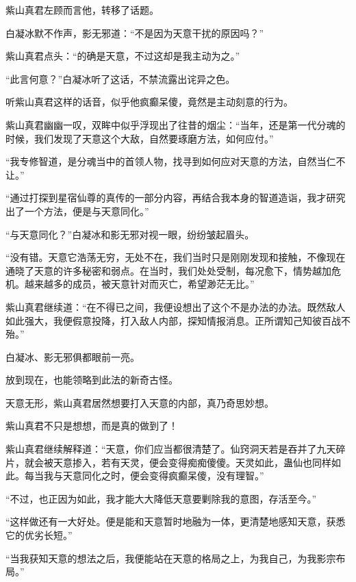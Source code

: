 
\begin{this_body}



紫山真君左顾而言他，转移了话题。

白凝冰默不作声，影无邪道：“不是因为天意干扰的原因吗？”

紫山真君点头：“的确是天意，不过这却是我主动为之。”

“此言何意？”白凝冰听了这话，不禁流露出诧异之色。

听紫山真君这样的话音，似乎他疯癫呆傻，竟然是主动刻意的行为。

紫山真君幽幽一叹，双眸中似乎浮现出了往昔的烟尘：“当年，还是第一代分魂的时候，我们发现了天意这个大敌，自然要琢磨方法，如何应付。”

“我专修智道，是分魂当中的首领人物，找寻到如何应对天意的方法，自然当仁不让。”

“通过打探到星宿仙尊的真传的一部分内容，再结合我本身的智道造诣，我才研究出了一个方法，便是与天意同化。”

“与天意同化？”白凝冰和影无邪对视一眼，纷纷皱起眉头。

“没有错。天意它浩荡无穷，无处不在，我们当时只是刚刚发现和接触，不像现在通晓了天意的许多秘密和弱点。在当时，我们处处受制，每况愈下，情势越加危机。越来越多的成员，被天意针对而灭亡，希望渺茫无比。”

紫山真君继续道：“在不得已之间，我便设想出了这个不是办法的办法。既然敌人如此强大，我便假意投降，打入敌人内部，探知情报消息。正所谓知己知彼百战不殆。”

白凝冰、影无邪俱都眼前一亮。

放到现在，也能领略到此法的新奇古怪。

天意无形，紫山真君居然想要打入天意的内部，真乃奇思妙想。

紫山真君不只是想想，而是真的做到了！

紫山真君继续解释道：“天意，你们应当都很清楚了。仙窍洞天若是吞并了九天碎片，就会被天意掺入，若有天灵，便会变得痴痴傻傻。天灵如此，蛊仙也同样如此。每当我与天意同化之时，便会变得疯癫呆傻，没有理智。”

“不过，也正因为如此，我才能大大降低天意要剿除我的意图，存活至今。”

“这样做还有一大好处。便是能和天意暂时地融为一体，更清楚地感知天意，获悉它的优劣长短。”

“当我获知天意的想法之后，我便能站在天意的格局之上，为我自己，为我影宗布局。”


\end{this_body}
